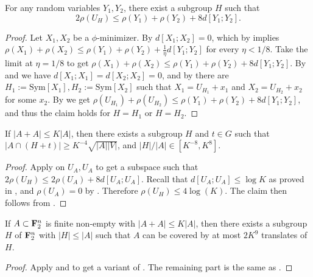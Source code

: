 \begin{proposition} \label{pfr-rho} For any random variables $Y_1,Y_2$, there exist a subgroup $H$ such that
  $$ 2\rho(U_H) \leq \rho(Y_1) + \rho(Y_2) + 8 d[Y_1;Y_2].$$
\end{proposition}
\begin{proof}
Let $X_1,X_2$ be a $\phi$-minimizer. By  $d[X_1;X_2]=0$, which by  implies $\rho(X_1)+\rho(X_2)\le \rho(Y_1) + \rho(Y_2) + \frac{1}{\eta} d[Y_1;Y_2]$ for every $\eta<1/8$. Take the limit at $\eta=1/8$ to get $\rho(X_1)+\rho(X_2)\le \rho(Y_1) + \rho(Y_2) + 8 d[Y_1;Y_2]$.
By  and  we have $d[X_1;X_1]=d[X_2;X_2]=0$, and by  there are $H_1:=\mathrm{Sym}[X_1],H_2:=\mathrm{Sym}[X_2]$ such that $X_1=U_{H_1}+x_1$ and $X_2=U_{H_2}+x_2$ for some $x_2$.
By  we get $\rho(U_{H_1})+\rho(U_{H_2})\le \rho(Y_1) + \rho(Y_2) + 8 d[Y_1;Y_2]$, and thus the claim holds for $H=H_1$ or $H=H_2$.
\end{proof}

\begin{corollary}\label{pfr-9-aux}
If $|A+A| \leq K|A|$, then there exists a subgroup $H$ and $t\in G$ such that $|A \cap (H+t)| \geq K^{-4} \sqrt{|A||V|}$, and $|H|/|A|\in[K^{-8},K^8]$.
\end{corollary}
\begin{proof}
  Apply  on $U_A,U_A$ to get a subspace such that $2\rho(U_H)\le 2\rho(U_A)+8d[U_A;U_A]$. Recall that $d[U_A;U_A]\le \log K$ as proved in , and $\rho(U_A)=0$ by . Therefore $\rho(U_H)\le 4\log(K)$. The claim then follows from .
\end{proof}

\begin{theorem}[PFR with \texorpdfstring{$C=9$}{C=9}]\label{pfr-9}  If $A \subset {\bf F}_2^n$ is finite non-empty with $|A+A| \leq K|A|$, then there exists a subgroup $H$ of ${\bf F}_2^n$ with $|H| \leq |A|$ such that $A$ can be covered by at most $2K^9$ translates of $H$.
\end{theorem}

\begin{proof}
Apply  and  to get a variant of . The remaining part is the same as .
\end{proof}
